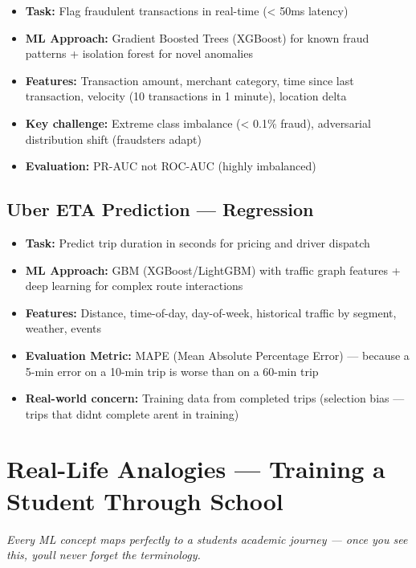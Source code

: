 \documentclass[11pt]{article}
\providecommand{\tightlist}{\setlength{\itemsep}{1pt}\setlength{\parskip}{0pt}}
\begin{document}
\begin{itemize}
\tightlist
\item
  \textbf{Task:} Flag fraudulent transactions in real-time (\textless{} 50ms latency)
\item
  \textbf{ML Approach:} Gradient Boosted Trees (XGBoost) for known fraud patterns + isolation forest for novel anomalies
\item
  \textbf{Features:} Transaction amount, merchant category, time since last transaction, velocity (10 transactions in 1 minute), location delta
\item
  \textbf{Key challenge:} Extreme class imbalance (\textless{} 0.1\% fraud), adversarial distribution shift (fraudsters adapt)
\item
  \textbf{Evaluation:} PR-AUC not ROC-AUC (highly imbalanced)
\end{itemize}

\subsection{Uber ETA Prediction --- Regression}\label{uber-eta-prediction--regression}

\begin{itemize}
\tightlist
\item
  \textbf{Task:} Predict trip duration in seconds for pricing and driver dispatch
\item
  \textbf{ML Approach:} GBM (XGBoost/LightGBM) with traffic graph features + deep learning for complex route interactions
\item
  \textbf{Features:} Distance, time-of-day, day-of-week, historical traffic by segment, weather, events
\item
  \textbf{Evaluation Metric:} MAPE (Mean Absolute Percentage Error) --- because a 5-min error on a 10-min trip is worse than on a 60-min trip
\item
  \textbf{Real-world concern:} Training data from completed trips (selection bias --- trips that didn\textquotesingle t complete aren\textquotesingle t in training)
\end{itemize}

\section{Real-Life Analogies --- Training a Student Through School}\label{real-life-analogies--training-a-student-through-school}

\emph{Every ML concept maps perfectly to a student\textquotesingle s academic journey --- once you see this, you\textquotesingle ll never forget the terminology.}
\end{document}
